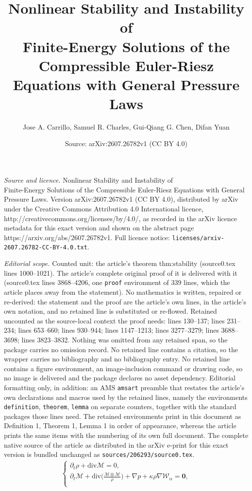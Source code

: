 \documentclass[10pt,a4paper]{amsart}
\title{Nonlinear Stability and Instability of\\ Finite-Energy Solutions of the Compressible Euler-Riesz Equations with General Pressure Laws}
\author{Jose A. Carrillo, Samuel R. Charles, Gui-Qiang G. Chen, Difan Yuan}
\date{Source: arXiv:2607.26782v1 (CC BY 4.0)}
\begin{document}
\maketitle

\noindent\emph{Source and licence.} Nonlinear Stability and Instability of\\ Finite-Energy Solutions of the Compressible Euler-Riesz Equations with General Pressure Laws. Version arXiv:2607.26782v1 (CC BY 4.0), distributed by arXiv under the Creative Commons Attribution 4.0 International licence, http://creativecommons.org/licenses/by/4.0/, as recorded in the arXiv licence metadata for this exact version and shown on the abstract page https://arxiv.org/abs/2607.26782v1. Full licence notice: \texttt{licenses/arxiv-2607.26782-CC-BY-4.0.txt}.\par\smallskip

\noindent\textit{Editorial scope.} Counted unit: the article's theorem thm:stability (source0.tex lines 1000--1021). The article's complete original proof of it is delivered with it (source0.tex lines 3868--4206, one \texttt{proof} environment of 339 lines, which the article places away from the statement). No mathematics is written, repaired or re-derived: the statement and the proof are the article's own lines, in the article's own notation, and no retained line is substituted or re-flowed.  Retained uncounted as the source-local context the proof needs: lines 130--137; lines 231--234; lines 653--660; lines 930--944; lines 1147--1213; lines 3277--3279; lines 3688--3698; lines 3823--3832.  Nothing was omitted from any retained span, so the package carries no omission record.  No retained line contains a citation, so the wrapper carries no bibliography and no bibliography entry.  No retained line contains a figure environment, an image-inclusion command or drawing code, so no image is delivered and the package declares no asset dependency.  Editorial formatting only, in addition: an AMS \texttt{amsart} preamble that restates the article's own declarations and macros used by the retained lines, namely the environments \texttt{definition}, \texttt{theorem}, \texttt{lemma} on separate counters, together with the standard packages those lines need.  The retained environments print in this document as Definition 1, Theorem 1, Lemma 1 in order of appearance, whereas the article prints the same items with the numbering of its own full document.  The complete native source of the article as distributed in the arXiv e-print for this exact version is bundled unchanged as \texttt{sources/206293/source0.tex}.
\begin{align}\label{1.1}
\begin{cases}
\displaystyle
\partial_t \rho+\mbox{div} \mathcal{M}=0,\\
\displaystyle
\partial_t \mathcal{M}+\mbox{div}\Big(\frac{\mathcal{M}\otimes \mathcal{M}}{\rho}\Big)+\nabla p+\kappa\rho\nabla\mathcal{W}_\alpha=\boldsymbol{0},\\
\end{cases}
\end{align}
\end{document}

